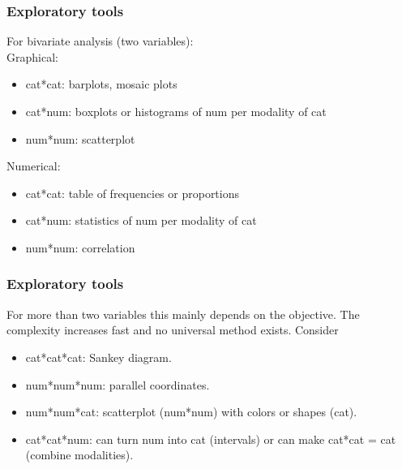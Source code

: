 \begin{frame}
\frametitle{Exploratory tools}
For bivariate analysis (two variables):\\
\vspace{0.3cm}
Graphical:
\begin{itemize}
\item cat*cat: barplots, mosaic plots 
\item cat*num: boxplots or histograms of num per modality of cat 
\item num*num: scatterplot 
\end{itemize}
Numerical:
\begin{itemize}
\item cat*cat: table of frequencies or proportions
\item cat*num: statistics of num per modality of cat
\item num*num: correlation
\end{itemize}
\end{frame}
\begin{frame}
\frametitle{Exploratory tools}
For more than two variables this mainly depends on the objective. The complexity increases fast and no universal method exists. Consider
\begin{itemize}
\item cat*cat*cat: Sankey diagram.
\item num*num*num: parallel coordinates.
\item num*num*cat: scatterplot (num*num) with colors or shapes (cat).
\item cat*cat*num: can turn num into cat (intervals) or can make cat*cat = cat (combine modalities).
\end{itemize}
\end{frame}
